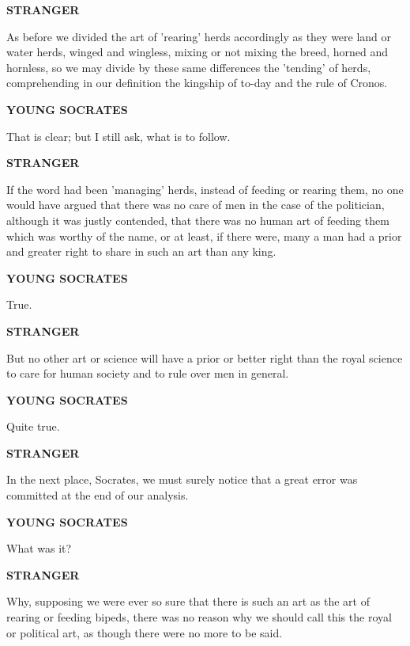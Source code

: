 \documentclass[11pt,letter]{article}
\begin{document}
\par \textbf{STRANGER}
\par   As before we divided the art of 'rearing' herds accordingly as they were land or water herds, winged and wingless, mixing or not mixing the breed, horned and hornless, so we may divide by these same differences the 'tending' of herds, comprehending in our definition the kingship of to-day and the rule of Cronos.

\par \textbf{YOUNG SOCRATES}
\par   That is clear; but I still ask, what is to follow.

\par \textbf{STRANGER}
\par   If the word had been 'managing' herds, instead of feeding or rearing them, no one would have argued that there was no care of men in the case of the politician, although it was justly contended, that there was no human art of feeding them which was worthy of the name, or at least, if there were, many a man had a prior and greater right to share in such an art than any king.

\par \textbf{YOUNG SOCRATES}
\par   True.

\par \textbf{STRANGER}
\par   But no other art or science will have a prior or better right than the royal science to care for human society and to rule over men in general.

\par \textbf{YOUNG SOCRATES}
\par   Quite true.

\par \textbf{STRANGER}
\par   In the next place, Socrates, we must surely notice that a great error was committed at the end of our analysis.

\par \textbf{YOUNG SOCRATES}
\par   What was it?

\par \textbf{STRANGER}
\par   Why, supposing we were ever so sure that there is such an art as the art of rearing or feeding bipeds, there was no reason why we should call this the royal or political art, as though there were no more to be said.
\end{document}

